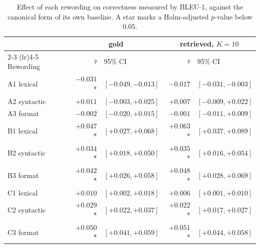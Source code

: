 \documentclass[12pt,a4paper,oneside]{scrreprt}
\begin{document}
\begin{table}[htbp]
\centering
\caption{Effect of each rewording on correctness measured by BLEU-1, against the canonical form of its own baseline. A star marks a Holm-adjusted $p$-value below $0.05$.}
\label{tab:bleu}
\begin{tabular}{lrlrl}
\toprule
 & \multicolumn{2}{c}{gold} & \multicolumn{2}{c}{retrieved, $K = 10$} \\
\cmidrule(lr){2-3} \cmidrule(lr){4-5}
Rewording & $\hat{\tau}$ & 95\% CI & $\hat{\tau}$ & 95\% CI \\
\midrule
A1 lexical   & $-0.031$* & $[-0.049, -0.013]$ & $-0.017$\phantom{*} & $[-0.031, -0.003]$ \\
A2 syntactic & $+0.011$\phantom{*} & $[-0.003, +0.025]$ & $+0.007$\phantom{*} & $[-0.009, +0.022]$ \\
A3 format    & $-0.002$\phantom{*} & $[-0.020, +0.015]$ & $-0.001$\phantom{*} & $[-0.011, +0.009]$ \\
B1 lexical   & $+0.047$* & $[+0.027, +0.068]$ & $+0.063$* & $[+0.037, +0.089]$ \\
B2 syntactic & $+0.034$* & $[+0.018, +0.050]$ & $+0.035$* & $[+0.016, +0.054]$ \\
B3 format    & $+0.042$* & $[+0.026, +0.058]$ & $+0.048$* & $[+0.028, +0.069]$ \\
C1 lexical   & $+0.010$\phantom{*} & $[+0.002, +0.018]$ & $+0.006$\phantom{*} & $[+0.001, +0.010]$ \\
C2 syntactic & $+0.029$* & $[+0.022, +0.037]$ & $+0.022$* & $[+0.017, +0.027]$ \\
C3 format    & $+0.050$* & $[+0.041, +0.059]$ & $+0.051$* & $[+0.044, +0.058]$ \\
\bottomrule
\end{tabular}
\end{table}
\end{document}
